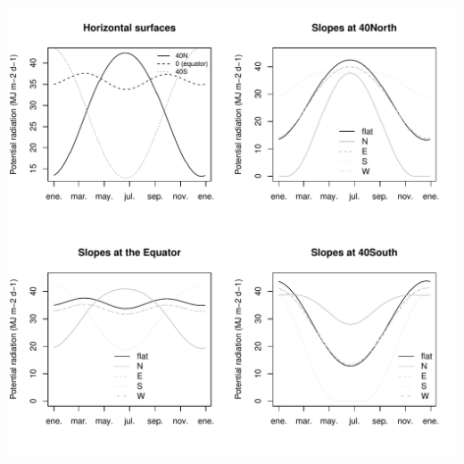 \documentclass[11pt,a4paper]{article}
\begin{document}
\begin{center}
\includegraphics{Meteorology-015}
\end{center}
\end{document}

